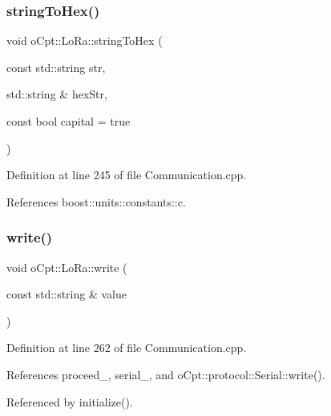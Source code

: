 \hypertarget{classo_cpt_1_1_lo_ra_a3671543fd5f0297ca7e7fb533020bea9}{}\label{classo_cpt_1_1_lo_ra_a3671543fd5f0297ca7e7fb533020bea9} 
\subsubsection{\texorpdfstring{string\+To\+Hex()}{stringToHex()}}
{\footnotesize\ttfamily void o\+Cpt\+::\+Lo\+Ra\+::string\+To\+Hex (\begin{DoxyParamCaption}\item[{const std\+::string}]{str,  }\item[{std\+::string \&}]{hex\+Str,  }\item[{const bool}]{capital = {\ttfamily true} }\end{DoxyParamCaption})\hspace{0.3cm}{\ttfamily [protected]}}



Definition at line 245 of file Communication.\+cpp.



References boost\+::units\+::constants\+::c.

\hypertarget{classo_cpt_1_1_lo_ra_aa96080e6911f8355be8c59da33bfa9d1}{}\label{classo_cpt_1_1_lo_ra_aa96080e6911f8355be8c59da33bfa9d1} 
\subsubsection{\texorpdfstring{write()}{write()}}
{\footnotesize\ttfamily void o\+Cpt\+::\+Lo\+Ra\+::write (\begin{DoxyParamCaption}\item[{const std\+::string \&}]{value }\end{DoxyParamCaption})\hspace{0.3cm}{\ttfamily [protected]}}



Definition at line 262 of file Communication.\+cpp.



References proceed\+\_\+, serial\+\_\+, and o\+Cpt\+::protocol\+::\+Serial\+::write().



Referenced by initialize().


